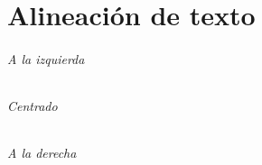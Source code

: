 \part{Alineación de texto}
\paragraph{A la izquierda}
\begin{flushleft}
\normalsize{\lipsum [7]}
\end{flushleft}
\paragraph{Centrado}
\begin{center}
\normalsize{\lipsum [8]}
\end{center}
\paragraph{A la derecha}
\begin{flushright}
\normalsize{\lipsum [9]}
\end{flushright}